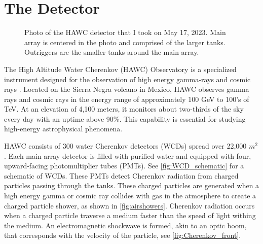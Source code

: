 \section{The Detector}\label{sec:THE_hawc}

\begin{figure}[h!]
    \caption{Photo of the HAWC detector that I took on May 17, 2023. Main array is centered in the photo and comprised of the larger tanks. Outriggers are the smaller tanks around the main array.}
    \label{fig:HAWC}
\end{figure}

The High Altitude Water Cherenkov (HAWC) Observatory is a specialized instrument designed for the observation of high energy gamma-rays and cosmic rays \cite{HAWC_NIM}.
Located on the Sierra Negra volcano in Mexico, HAWC observes gamma rays and cosmic rays in the energy range of approximately 100 GeV to 100's of TeV.
At an elevation of 4,100 meters, it monitors about two-thirds of the sky every day with an uptime above 90\%.
This capability is essential for studying high-energy astrophysical phenomena.

HAWC consists of 300 water Cherenkov detectors (WCDs) spread over 22,000 $m^2$.
Each main array detector is filled with purified water and equipped with four, upward-facing photomultiplier tubes (PMTs).
See \cref{fig:WCD_schematic} for a schematic of WCDs.
These PMTs detect Cherenkov radiation from charged particles passing through the tanks.
These charged particles are generated when a high energy gamma or cosmic ray collides with gas in the atmosphere to create a charged particle shower, as shown in \cref{fig:airshowers}.
Cherenkov radiation occurs when a charged particle traverse a medium faster than the speed of light withing the medium.
An electromagnetic shockwave is formed, akin to an optic boom, that corresponds with the velocity of the particle, see \cref{fig:Cherenkov_front}.

